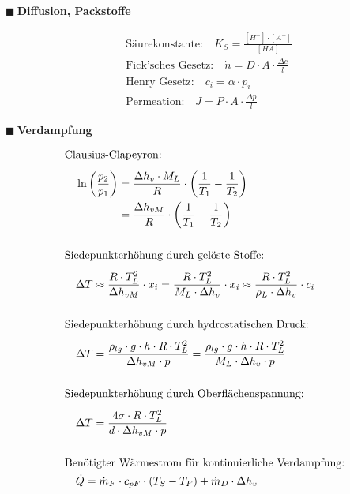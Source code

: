 \documentclass[a4paper,10pt]{article}
\renewcommand{\textbf}[1]{\textsf{{\bfseries {#1}}}}
\renewcommand{\plmtsquare}{{\color{miugray} $\blacksquare~$}}
\begin{document}
\begin{minipage}[t]{.45\textwidth}
\vspace*{5.5mm}
\plmtsquare \textbf{Diffusion, Packstoffe} \par \vspace*{-4mm}
\begin{align*}
&\text{Säurekonstante:} \quad K_S = \frac{[H^+] \cdot [A^-]}{[HA]} \\ 
&\text{Fick'sches Gesetz:} \quad \dot{n} = D \cdot A \cdot \frac{\Delta c}{l} \\[5pt]
&\text{Henry Gesetz:} \quad c_i = \alpha \cdot p_i \\[3pt]
&\text{Permeation:} \quad J = P \cdot A \cdot \frac{\Delta p}{l}   
\end{align*}


\vspace*{6mm}
\plmtsquare \textbf{Verdampfung} \par \vspace*{-4mm}
\begin{align*}
&\text{Clausius-Clapeyron:}\\[4pt]
& \quad \ln\left(\frac{p_2}{p_1}\right) = \frac{\Delta h_v \cdot M_L}{R} \cdot \left(\frac{1}{T_1} - \frac{1}{T_2}\right) \\ 
& \hspace*{17mm} = \frac{\Delta h_{vM}}{R} \cdot \left(\frac{1}{T_1} - \frac{1}{T_2}\right) \\ \\
& \text{Siedepunkterhöhung durch gelöste Stoffe:} \\[4pt]
& \quad \Delta T \approx \frac{R \cdot T_L^2}{\Delta h_{vM}} \cdot x_i = \frac{R \cdot T_L^2}{M_L \cdot \Delta h_v} \cdot x_i \approx \frac{R \cdot T_L^2}{\rho_L \cdot \Delta h_v} \cdot c_i \\ \\
& \text{Siedepunkterhöhung durch hydrostatischen Druck:} \\[4pt]
& \quad \Delta T = \frac{\rho_{lg} \cdot g \cdot h \cdot R \cdot T_L^2}{\Delta h_{vM} \cdot p} = \frac{\rho_{lg} \cdot g \cdot h \cdot R \cdot T_L^2}{M_L \cdot \Delta h_v \cdot p}\\ \\
& \text{Siedepunkterhöhung durch Oberflächenspannung:} \\[4pt]
& \quad \Delta T = \frac{4\sigma \cdot R \cdot T_L^2}{d \cdot \Delta h_{vM} \cdot p} \\ \\
& \text{Benötigter Wärmestrom für kontinuierliche Verdampfung:} \\
& \quad \dot{Q} = \dot{m}_F \cdot c_{pF} \cdot (T_S - T_F) + \dot{m}_D \cdot \Delta h_v
\end{align*}



\end{minipage}
\end{document}
